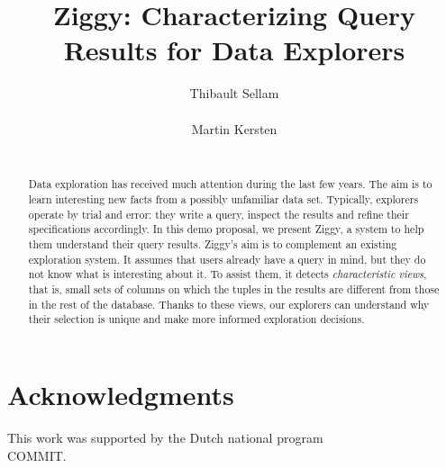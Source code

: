 \documentclass{vldb}
\begin{document}
\title{Ziggy: Characterizing Query Results for Data Explorers}

\author{
\alignauthor
    Thibault Sellam\\
    \\
\alignauthor
Martin Kersten\\
    \\
}


\maketitle
\thispagestyle{empty}

\begin{abstract}
Data exploration has received much attention during the last few years. The aim
is to learn interesting new facts from a possibly unfamiliar data set.
Typically, explorers operate by trial and error: they write a query, inspect
the results and refine their specifications accordingly. In this demo proposal,
we present Ziggy, a system to help them understand their query results. Ziggy's
aim is to complement an existing exploration system. It assumes that users
already have a query in mind, but they do not know what is interesting about
it. To assist them, it detects \emph{characteristic views}, that is, small sets
of columns on which the tuples in the results are different from those in the
rest of the database.  Thanks to these views, our explorers can understand why 
their selection is unique and make more informed exploration decisions.
\end{abstract}


\section{Acknowledgments}
This work was supported by the Dutch national program \\COMMIT.

\small

\end{document}
